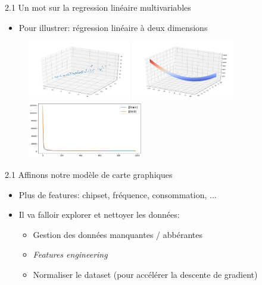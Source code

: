 \begin{frame}{2.1 Un mot sur la regression linéaire multivariables}
  \begin{itemize}
  \item Pour illustrer: régression linéaire à deux dimensions
  \end{itemize}
  \begin{figure}
    \includegraphics[width=0.4\textwidth]{fig/multiVarData.png}
    \includegraphics[width=0.4\textwidth]{fig/multiVarCostFct.png}\\
    \includegraphics[width=0.45\textwidth]{fig/multiVarDesc.png}
  \end{figure}
\end{frame}

\begin{frame}{2.1 Affinons notre modèle de carte graphiques}
  \begin{itemize}
  \item Plus de features: chipset, fréquence, consommation, ...
  \item Il va falloir explorer et nettoyer les données:
    \begin{itemize}
      \normalsize
    \item Gestion des données manquantes / abbérantes
    \item \textit{Features engineering}
    \item Normaliser le dataset (pour accélérer la descente de gradient)
    \end{itemize}
  \end{itemize}
\end{frame}

